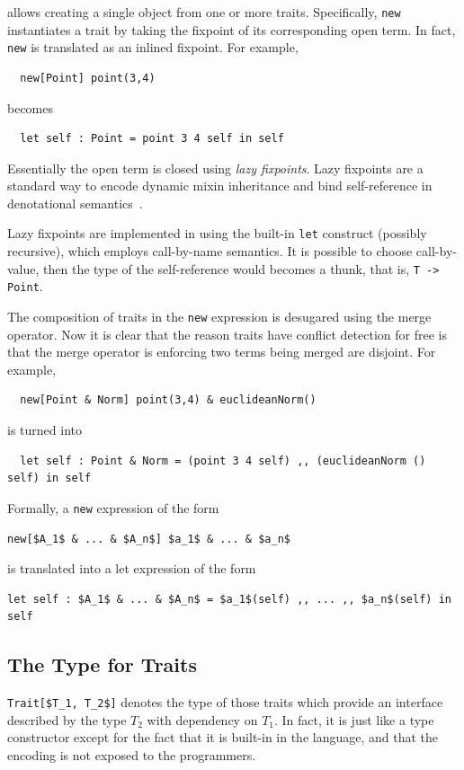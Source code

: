 \name allows creating a single object from one or more traits. Specifically,
\lstinline{new} instantiates a trait by taking the fixpoint of its
corresponding open term. In fact, \lstinline{new} is translated as an inlined
fixpoint. For example,
\begin{lstlisting}
  new[Point] point(3,4)
\end{lstlisting}
becomes
\begin{lstlisting}
  let self : Point = point 3 4 self in self
\end{lstlisting}
Essentially the open term is closed using \textit{lazy fixpoints}. Lazy
fixpoints are a standard way to encode dynamic mixin inheritance and bind
self-reference in denotational semantics~\cite{cook1989denotational}.

Lazy fixpoints are implemented in \name using the built-in \lstinline{let}
construct (possibly recursive), which employs call-by-name semantics. It is
possible to choose call-by-value, then the type of the self-reference would
becomes a thunk, that is, \lstinline$T -> Point$.

The composition of traits in the \lstinline{new} expression is desugared using
the merge operator. Now it is clear that the reason traits have conflict
detection for free is that the merge operator is enforcing two terms being
merged are disjoint. For example,
\begin{lstlisting}
  new[Point & Norm] point(3,4) & euclideanNorm()
\end{lstlisting}
is turned into
\begin{lstlisting}
  let self : Point & Norm = (point 3 4 self) ,, (euclideanNorm () self) in self
\end{lstlisting}

Formally, a \lstinline{new} expression of the form
\begin{lstlisting}[mathescape=true]
  new[$A_1$ & ... & $A_n$] $a_1$ & ... & $a_n$
\end{lstlisting}
is translated into a let expression of the form
\begin{lstlisting}[mathescape=true]
  let self : $A_1$ & ... & $A_n$ = $a_1$(self) ,, ... ,, $a_n$(self) in self
\end{lstlisting}

\subsection{The Type for Traits}

\lstinline[mathescape=true]{Trait[$T_1, T_2$]} denotes the type of those traits
which provide an interface described by the type $T_2$ with dependency on $T_1$.
In fact, it is just like a type constructor except for the fact that it is
built-in in the language, and that the encoding is not exposed to the
programmers.

